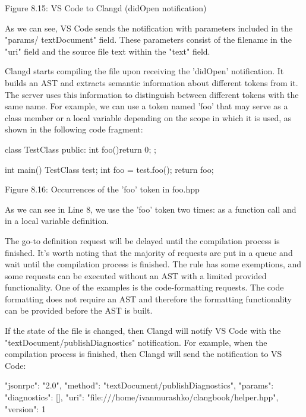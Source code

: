 \begin{center}
Figure 8.15: VS Code to Clangd (didOpen notification)
\end{center}

As we can see, VS Code sends the notification with parameters included in the "params/ textDocument" field. These parameters consist of the filename in the "uri" field and the source file text within the "text" field.

Clangd starts compiling the file upon receiving the 'didOpen' notification. It builds an AST and extracts semantic information about different tokens from it. The server uses this information to distinguish between different tokens with the same name. For example, we can use a token named 'foo' that may serve as a class member or a local variable depending on the scope in which it is used, as shown in the following code fragment:

\begin{cpp}
class TestClass {
public:
  int foo(){return 0};
};

int main() {
  TestClass test;
  int foo = test.foo();
  return foo;
}
\end{cpp}

\begin{center}
Figure 8.16: Occurrences of the 'foo' token in foo.hpp
\end{center}

As we can see in Line 8, we use the 'foo' token two times: as a function call and in a local variable definition.

The go-to definition request will be delayed until the compilation process is finished. It's worth noting that the majority of requests are put in a queue and wait until the compilation process is finished. The rule has some exemptions, and some requests can be executed without an AST with a limited provided functionality. One of the examples is the code-formatting requests. The code formatting does not require an AST and therefore the formatting functionality can be provided before the AST is built.

If the state of the file is changed, then Clangd will notify VS Code with the "textDocument/publishDiagnostics" notification. For example, when the compilation process is finished, then Clangd will send the notification to VS Code:

\begin{shell}
{
  "jsonrpc": "2.0",
  "method": "textDocument/publishDiagnostics",
  "params": {
    "diagnostics": [],
    "uri": "file:///home/ivanmurashko/clangbook/helper.hpp",
    "version": 1
  }
}
\end{shell}


